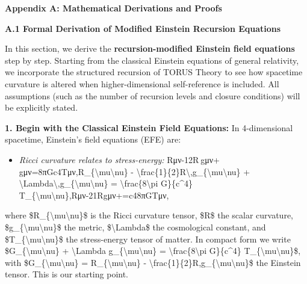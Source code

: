 \documentclass[
]{article}
\author{}
\date{}
\begin{document}
\textbf{Appendix A: Mathematical Derivations and Proofs}

\textbf{A.1 Formal Derivation of Modified Einstein Recursion Equations}

In this section, we derive the \textbf{recursion-modified Einstein field
equations} step by step. Starting from the classical Einstein equations
of general relativity, we incorporate the structured recursion of TORUS
Theory to see how spacetime curvature is altered when higher-dimensional
self-reference is included. All assumptions (such as the number of
recursion levels and closure conditions) will be explicitly stated.

\textbf{1. Begin with the Classical Einstein Field Equations:} In
4-dimensional spacetime, Einstein's field equations (EFE) are:

\begin{itemize}
\item
  \emph{Ricci curvature relates to stress-energy:}
  Rμν-12R gμν+\Lambda gμν=8πGc4Tμν,R\_\{\textbackslash mu\textbackslash nu\} -
  \textbackslash frac\{1\}\{2\}R\textbackslash,g\_\{\textbackslash mu\textbackslash nu\}
  +
  \textbackslash Lambda\textbackslash,g\_\{\textbackslash mu\textbackslash nu\}
  = \textbackslash frac\{8\textbackslash pi G\}\{c\^{}4\}
  T\_\{\textbackslash mu\textbackslash nu\},Rμν\hspace{0pt}-21\hspace{0pt}Rgμν\hspace{0pt}+\hspace{0pt}=c48πG\hspace{0pt}Tμν\hspace{0pt},
\end{itemize}

where \$R\_\{\textbackslash mu\textbackslash nu\}\$ is the Ricci
curvature tensor, \$R\$ the scalar curvature,
\$g\_\{\textbackslash mu\textbackslash nu\}\$ the metric,
\$\textbackslash Lambda\$ the cosmological constant, and
\$T\_\{\textbackslash mu\textbackslash nu\}\$ the stress-energy tensor
of matter. In compact form we write
\$G\_\{\textbackslash mu\textbackslash nu\} + \textbackslash Lambda
g\_\{\textbackslash mu\textbackslash nu\} =
\textbackslash frac\{8\textbackslash pi G\}\{c\^{}4\}
T\_\{\textbackslash mu\textbackslash nu\}\$, with
\$G\_\{\textbackslash mu\textbackslash nu\} =
R\_\{\textbackslash mu\textbackslash nu\} -
\textbackslash frac\{1\}\{2\}R,g\_\{\textbackslash mu\textbackslash nu\}\$
the Einstein tensor. This is our starting point\hspace{0pt}.
\end{document}
